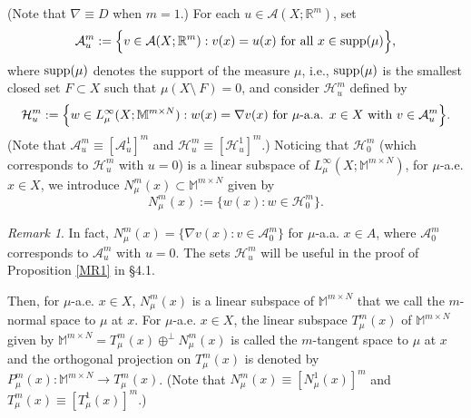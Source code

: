 \documentclass[10pt]{amsart}
\numberwithin{equation}{section}
\theoremstyle{definition}
\theoremstyle{remark}
\newtheorem{remark}[theorem]{Remark}
\begin{document}
(Note that $\nabla\equiv D$ when $m=1$.) For each $u\in\mathcal{A}(X;{{\mathbb R}}^m)$, set 
\begin{equation}\label{Def-of-Amu}
\mathcal{A}_u^m:=\Big\{v\in\mathcal{A}(X;{{\mathbb R}}^m):v(x)=u(x)\hbox{ for all }x\in{{\rm supp}}(\mu) \Big\},
\end{equation}
where ${{\rm supp}}(\mu)$ denotes the support of the measure $\mu$, i.e., ${{\rm supp}}(\mu)$ is the smallest closed set $F\subset X$ such that $\mu(X\setminus\ F)=0$, and consider $\mathcal{H}_u^m$ defined by
$$
\mathcal{H}_u^m:=\Big\{w\in L_\mu^\infty(X;{{\mathbb M}^{m\times N}}):w(x)=\nabla v(x)\hbox{ for $\mu$-a.a. }x\in X\hbox{ with }v\in\mathcal{A}_u^m\Big\}.
$$
(Note that $\mathcal{A}^m_u\equiv[\mathcal{A}^1_u]^m$ and  $\mathcal{H}^m_u\equiv[\mathcal{H}^1_u]^m$.)
Noticing that $\mathcal{H}_0^m$ (which corresponds to $\mathcal{H}_u^m$ with $u=0$) is a linear subspace of $L_\mu^\infty(X;{{\mathbb M}^{m\times N}})$, for $\mu$-a.e. $x\in X$, we introduce $N_\mu^m(x)\subset {{\mathbb M}^{m\times N}}$ given by
$$
N_\mu^m(x):=\Big\{w(x):w\in\mathcal{H}_0^m\Big\}.
$$

\begin{remark}
In fact, $N_\mu^m(x)=\{\nabla v(x):v\in\mathcal{A}_0^m\}$ for $\mu$-a.a. $x\in A$, where $\mathcal{A}_0^m$ corresponds to $\mathcal{A}_u^m$ with $u=0$. The sets $\mathcal{H}_u^m$ will be useful in the proof of Proposition \ref{MR1} in \S 4.1.
\end{remark}

Then, for $\mu$-a.e. $x\in X$, $N_\mu^m(x)$ is a linear subspace of ${{\mathbb M}^{m\times N}}$ that we call the $m$-normal space to $\mu$ at $x$. For $\mu$-a.e. $x\in X$, the linear subspace $T_\mu^m(x)$ of ${{\mathbb M}^{m\times N}}$ given by ${{\mathbb M}^{m\times N}}=T_\mu^m(x)\oplus^\perp N_\mu^m(x)$ is called the $m$-tangent space to $\mu$ at $x$ and the orthogonal projection on $T^m_\mu(x)$ is denoted by $P_\mu^m(x):{{\mathbb M}^{m\times N}}\to T_\mu^m(x)$. (Note that $N^m_\mu(x)\equiv[N^1_\mu(x)]^m$ and $T^m_\mu(x)\equiv[T^1_\mu(x)]^m$.) 
\end{document}
